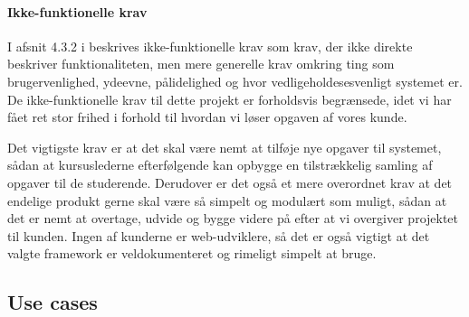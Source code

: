 \documentclass[12pt]{article}
\begin{document}
\paragraph{Ikke-funktionelle krav}
\label{par:ikke_funktionelle_krav}
I afsnit 4.3.2 i \cite{OOSE} beskrives ikke-funktionelle krav som krav, der ikke direkte beskriver funktionaliteten, men mere generelle krav omkring ting som brugervenlighed, ydeevne, pålidelighed og hvor vedligeholdesesvenligt systemet er. De ikke-funktionelle krav til dette projekt er forholdsvis begrænsede, idet vi har fået ret stor frihed i forhold til hvordan vi løser opgaven af vores kunde.

Det vigtigste krav er at det skal være nemt at tilføje nye opgaver til systemet, sådan at kursuslederne efterfølgende kan opbygge en tilstrækkelig samling af opgaver til de studerende. Derudover er det også et mere overordnet krav at det endelige produkt gerne skal være så simpelt og modulært som muligt, sådan at det er nemt at overtage, udvide og bygge videre på efter at vi overgiver projektet til kunden. Ingen af kunderne er web-udviklere, så det er også vigtigt at det valgte framework er veldokumenteret og rimeligt simpelt at bruge.


\subsection{Use cases}
\label{sub:use_cases}
\end{document}
